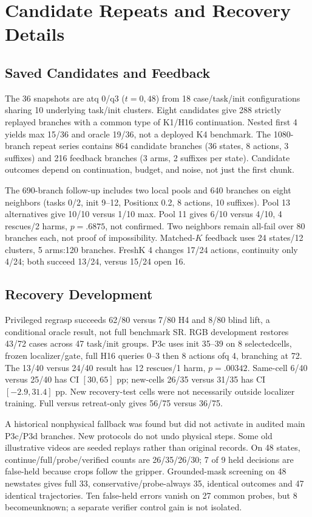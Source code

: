 \documentclass{article}
\begin{document}
\section{Candidate Repeats and Recovery Details}
\subsection{Saved Candidates and Feedback}
The 36 snapshots are atq 0/q3 ($t=0,48$) from 18 case/task/init configurations
sharing 10 underlying task/init clusters. Eight candidates give 288 strictly
replayed branches with a common type of K1/H16 continuation.
Nested first 4 yields max 15/36 and oracle 19/36, not a deployed K4 benchmark.
The 1080-branch repeat series contains 864 candidate branches
(36 states, 8 actions, 3 suffixes) and 216 feedback branches
(3 arms, 2 suffixes per state). Candidate outcomes depend on continuation,
budget, and noise, not just the first chunk.

The 690-branch follow-up includes two local pools and 640 branches on eight
neighbors (tasks 0/2, init 9--12, Positionx 0.2, 8 actions, 10 suffixes).
Pool 13 alternatives give 10/10 versus 1/10 max. Pool 11 gives 6/10 versus 4/10,
4 rescues/2 harms, $p=.6875$, not confirmed. Two neighbors remain all-fail over
80 branches each, not proof of impossibility.
Matched-$K$ feedback uses 24 states/12 clusters, 5 arms:120 branches.
FreshK 4 changes 17/24 actions, continuity only 4/24; both succeed 13/24,
versus 15/24 open 16.

\subsection{Recovery Development}
Privileged regrasp succeeds 62/80 versus 7/80 H4 and 8/80 blind lift,
a conditional oracle result, not full benchmark SR.
RGB development restores 43/72 cases across 47 task/init groups.
P3c uses init 35--39 on 8 selectedcells, frozen localizer/gate, full H16
queries 0--3 then 8 actions ofq 4, branching at 72.
The 13/40 versus 24/40 result has 12 rescues/1 harm, $p=.00342$.
Same-cell 6/40 versus 25/40 has CI $[30,65]$ pp; new-cells 26/35 versus 31/35 has
CI $[-2.9,31.4]$ pp. New recovery-test cells were not necessarily outside
localizer training. Full versus retreat-only gives 56/75 versus 36/75.

A historical nonphysical fallback was found but did not activate in audited
main P3c/P3d branches. New protocols do not undo physical steps.
Some old illustrative videos are seeded replays rather than original records.
On 48 states, continue/full/probe/verified counts are 26/35/26/30; 7 of 9 held
decisions are false-held because crops follow the gripper.
Grounded-mask screening on 48 newstates gives full 33,
conservative/probe-always 35, identical outcomes and 47 identical trajectories.
Ten false-held errors vanish on 27 common probes, but 8 becomeunknown;
a separate verifier control gain is not isolated.
\end{document}
